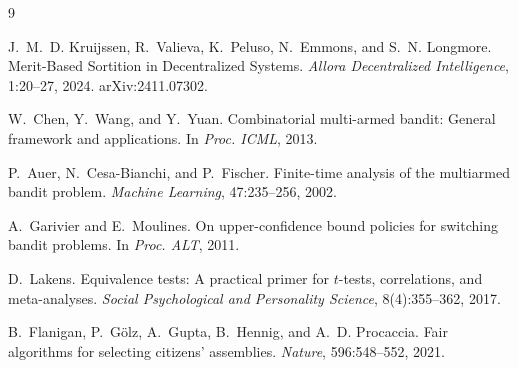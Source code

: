 \documentclass[10pt,twocolumn]{article}
\begin{document}
\begin{thebibliography}{9}\small

J.~M.~D. Kruijssen, R.~Valieva, K.~Peluso, N.~Emmons, and S.~N. Longmore.
\newblock Merit-Based Sortition in Decentralized Systems.
\newblock \emph{Allora Decentralized Intelligence}, 1:20--27, 2024.
\newblock arXiv:2411.07302.

W.~Chen, Y.~Wang, and Y.~Yuan.
\newblock Combinatorial multi-armed bandit: General framework and applications.
\newblock In \emph{Proc. ICML}, 2013.

P.~Auer, N.~Cesa-Bianchi, and P.~Fischer.
\newblock Finite-time analysis of the multiarmed bandit problem.
\newblock \emph{Machine Learning}, 47:235--256, 2002.

A.~Garivier and E.~Moulines.
\newblock On upper-confidence bound policies for switching bandit problems.
\newblock In \emph{Proc. ALT}, 2011.

D.~Lakens.
\newblock Equivalence tests: A practical primer for $t$-tests, correlations, and
meta-analyses.
\newblock \emph{Social Psychological and Personality Science}, 8(4):355--362, 2017.

B.~Flanigan, P.~G\"olz, A.~Gupta, B.~Hennig, and A.~D. Procaccia.
\newblock Fair algorithms for selecting citizens' assemblies.
\newblock \emph{Nature}, 596:548--552, 2021.

\end{thebibliography}
\end{document}
